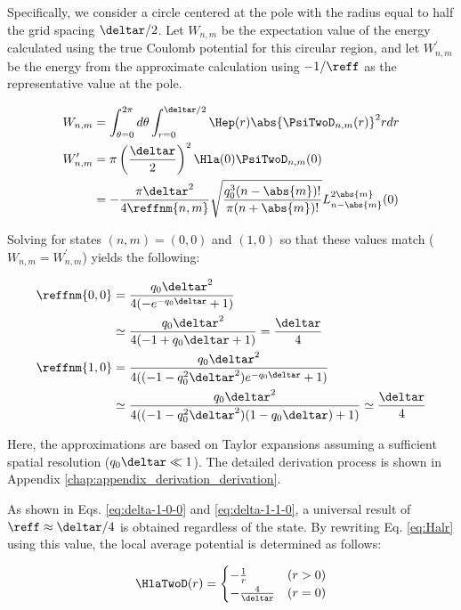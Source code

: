 \documentclass[manuscript_main.tex]{subfiles}
\begin{document}
Specifically, we consider a circle centered at the pole with the radius equal to
half the grid spacing $\deltar/2$. Let $W_{n,m}$ be the expectation value of the
energy calculated using the true Coulomb potential for this circular region, and
let $W_{n,m}^\prime$ be the energy from the approximate calculation using
$-1/\reff$ as the representative value at the pole.

\begin{align}
    W_{n,m}&=\int_{\theta=0}^{2\pi}d\theta\int_{r=0}^{\deltar/2}
    \Hep(r)\abs{\PsiTwoD_{n,m}(r)}^2r dr\\
    W_{n,m}^\prime&=\pi\left(\frac{\deltar}{2}\right)^2
    \Hla(0)\PsiTwoD_{n,m}(0) \notag \\
    &=-\frac{\pi\deltar^2}{4\reffnm{n,m}}
    \sqrt{\frac{q_0^3(n-\abs{m})!}{\pi(n+\abs{m})!}}
    L_{n-\abs{m}}^{2\abs{m}}(0)
\end{align}

Solving for states $(n,m)=(0,0)$ and $(1,0)$ so that these values match
($W_{n,m}=W_{n,m}^\prime$) yields the following:

\begin{align}
    \reffnm{0,0} &=\frac{q_0\deltar^2}{4(-e^{-q_0\deltar}+1)}\\
    &\simeq \frac{q_0\deltar^2}{4(-1+q_0\deltar+1)}=\frac{\deltar}{4}
    \label{eq:delta-1-0-0}\\
    \reffnm{1,0} &=\frac{q_0\deltar^2}{4((-1-q_0^2\deltar^2)e^{-q_0\deltar}+1)}\\
    &\simeq \frac{q_0\deltar^2}{4((-1-q_0^2\deltar^2)(1-q_0\deltar)+1)}
    \simeq\frac{\deltar}{4}
    \label{eq:delta-1-1-0}
\end{align}

Here, the approximations are based on Taylor expansions assuming a sufficient
spatial resolution ($q_0\deltar \ll 1$). The detailed derivation process is shown
in Appendix \ref{chap:appendix_derivation_derivation}.

As shown in Eqs. \eqref{eq:delta-1-0-0} and \eqref{eq:delta-1-1-0}, a universal
result of $\reff \approx \deltar/4$ is obtained regardless of the state. By
rewriting Eq. \eqref{eq:Halr} using this value, the local average potential is
determined as follows:

\begin{equation}
\HlaTwoD(r) = \begin{cases}
-\frac{1}{r} & (r>0) \\
-\frac{4}{\deltar} & (r=0)
\end{cases}
\label{eq:Hlar2d-fixed}
\end{equation}
\end{document}
